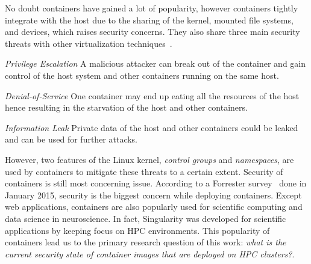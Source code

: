 \documentclass[a4paper,num-refs]{oup-contemporary}
\begin{document}
No doubt containers have gained a lot of popularity, however containers tightly
integrate with the host due to the sharing of the kernel, 
mounted file systems, and devices, which raises security
concerns.
They also share three main security threats with other virtualization
techniques~\cite{gantikow2016providing}.

\textit{Privilege Escalation} A malicious attacker can break out of the container
and gain control of the host system and other containers running on the same host.

\textit{Denial-of-Service} One container may end up eating all the resources of the
host hence resulting in the starvation of the host and other containers.

\textit{Information Leak} Private data of the host and other containers could be
leaked and can be used for further attacks.


However, two features of the Linux kernel, \textit{control groups} and \textit{namespaces},
are used by containers to mitigate these threats to a certain extent. Security
of containers is still most concerning issue. According to a Forrester survey~\cite{bettini2015vulnerability}
done in January 2015, security is the
biggest concern while deploying containers.
Except web applications, containers are also popularly used for scientific computing
and data science in neuroscience. In fact, Singularity was developed for scientific applications
by keeping focus on HPC environments. This popularity of containers lead us to the
primary research question of this work: \textit{what is the current security state of
container images that are deployed on HPC clusters?}.
\end{document}
